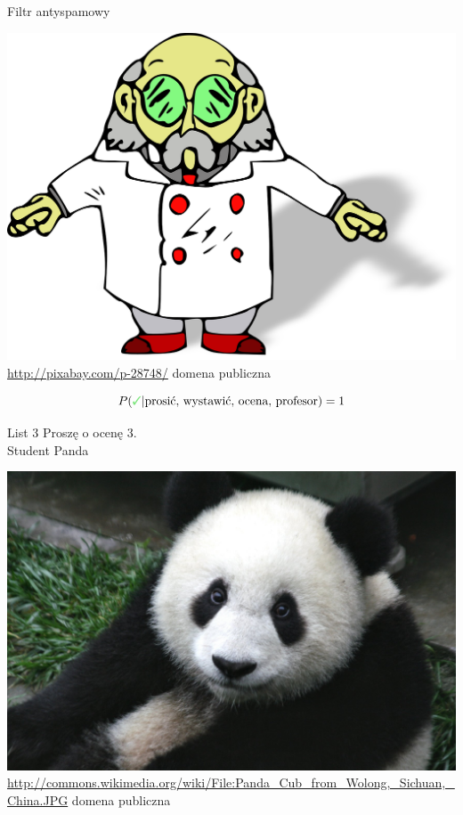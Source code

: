\documentclass{beamer}
\newcommand{\cmark}{\textcolor{green!80!black!50}{\text{\ding{51}}}}
\begin{document}
\begin{frame}{Filtr antyspamowy}
{\begin{minipage}{.45\textwidth}
\includegraphics[width=\textwidth]{bayes/scientist-28748_1280.png}\\
{\tiny \url{http://pixabay.com/p-28748/} domena publiczna}
\end{minipage}
\[ P(\cmark | \text{prosić, wystawić, ocena, profesor})=1 \]
}
{
	\begin{minipage}{.50\textwidth}
\begin{block}{List 3}
Proszę o ocenę 3.\\
Student Panda
\end{block}
\end{minipage}
\hfill
\begin{minipage}{.45\textwidth}
\includegraphics[width=\textwidth]{bayes/Panda_Cub_from_Wolong,_Sichuan,_China.JPG}\\
{\tiny \url{http://commons.wikimedia.org/wiki/File:Panda_Cub_from_Wolong,_Sichuan,_China.JPG} domena publiczna}
\end{minipage}

}
\end{frame}
\end{document}
